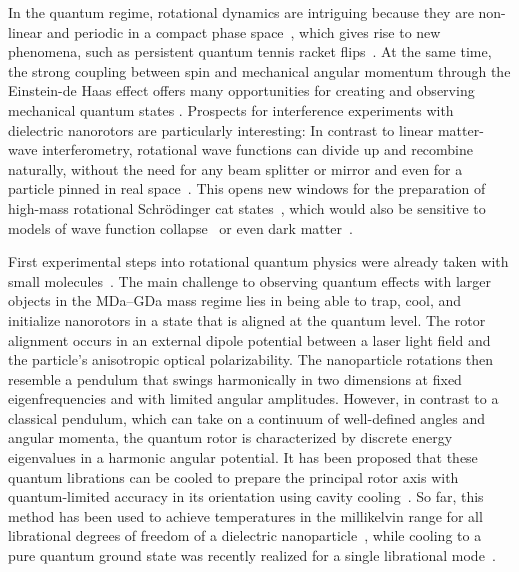 \documentclass[reprint, amsmath, amssymb, superscriptaddress,showkeys,aps,pra]{revtex4-2}
\begin{document}
In the quantum regime, rotational dynamics are intriguing because they are non-linear and periodic in a compact phase space~\cite{goldstein2002classical}, which gives rise to new phenomena, such as persistent quantum tennis racket flips~\cite{ma_quantum_2020}. At the same time, the strong coupling between spin and mechanical angular momentum through the Einstein-de Haas effect offers many opportunities for creating and observing mechanical quantum states \cite{yin2013large,hoang2016electron,rusconi_quantum_2017,Delord2018,delord_spin-cooling_2020,arita2023cooling,Jin2024}.
Prospects for interference experiments with dielectric nanorotors are particularly interesting: In contrast to linear matter-wave interferometry, rotational wave functions can divide up and recombine naturally,  without the need for any beam splitter or mirror and even for a particle pinned in real space~\cite{stickler_quantum_2021}. This opens new windows for the preparation of high-mass rotational Schrödinger cat states~\cite{stickler_probing_2018}, which would also be sensitive to models of wave function collapse~\cite{Schrinski2017} or even dark matter~\cite{Riedel2017,carney_mechanical_2021,Moore_2021}.
 
First experimental steps into rotational quantum physics were already taken with small molecules~\cite{Bretislav1995,seideman_revival_1999,poulsen_nonadiabatic_2004}. The main challenge to observing quantum effects with larger objects in the MDa--GDa mass regime lies in being able to trap, cool, and initialize nanorotors in a state that is aligned at the quantum level. The rotor alignment occurs in an external dipole potential between a laser light field and the particle's anisotropic optical polarizability. The nanoparticle rotations then resemble a pendulum that swings harmonically in two dimensions at fixed eigenfrequencies and with limited angular amplitudes. However, in contrast to a classical pendulum, which can take on a continuum of well-defined angles and angular momenta, the quantum rotor is characterized by discrete energy eigenvalues in a harmonic angular potential. It has been proposed that these quantum librations can be cooled to prepare the principal rotor axis with quantum-limited accuracy in its orientation using cavity cooling~\cite{stickler_rotranslational_2016,schafer_cooling_2021,rudolph_theory_2021}. So far, this method has been used to achieve temperatures in the millikelvin range for all librational degrees of freedom of a dielectric nanoparticle~\cite{kamba_nanoscale_2023,pontin_simultaneous_2023}, while cooling to a pure quantum ground state was recently realized for a single librational mode~\cite{dania_high-purity_2025}.
\end{document}
